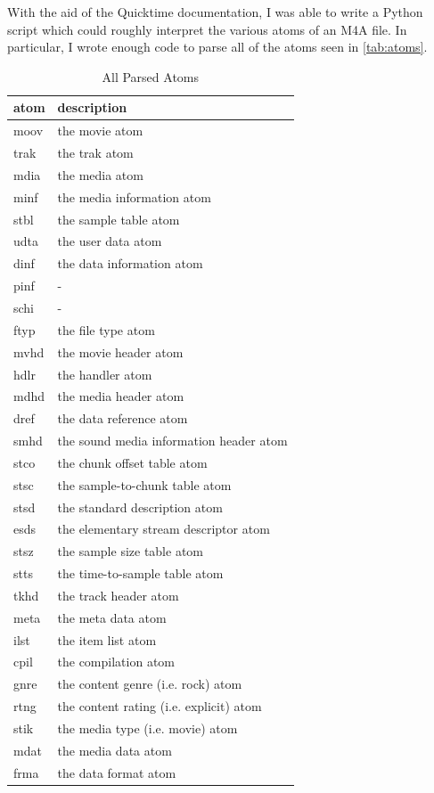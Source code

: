 \documentclass[journal]{vgtc}                %
\begin{document}
With the aid of the Quicktime documentation, I was able to write a Python script
which could roughly interpret the various atoms of an M4A file. In particular,
I wrote enough code to parse all of the atoms seen in \autoref{tab:atoms}.

\begin{table}[h]
  \caption{All Parsed Atoms}
  \label{tab:atoms}
  \scriptsize%
	\centering%
  \begin{tabu}{l l}
  \toprule
    atom & description \\
  \midrule
    moov & the movie atom \\
    trak & the trak atom \\
    mdia & the media atom \\
    minf & the media information atom \\
    stbl & the sample table atom \\
    udta & the user data atom \\
    dinf & the data information atom \\
    pinf & - \\
    schi & - \\
    ftyp & the file type atom \\
    mvhd & the movie header atom \\
    hdlr & the handler atom \\
    mdhd & the media header atom \\
    dref & the data reference atom \\
    smhd & the sound media information header atom \\
    stco & the chunk offset table atom \\
    stsc & the sample-to-chunk table atom \\
    stsd & the standard description atom \\
    esds & the elementary stream descriptor atom \\
    stsz & the sample size table atom \\
    stts & the time-to-sample table atom \\
    tkhd & the track header atom \\
    meta & the meta data atom \\
    ilst & the item list atom \\
    cpil & the compilation atom \\
    gnre & the content genre (i.e. rock) atom \\
    rtng & the content rating (i.e. explicit) atom \\
    stik & the media type (i.e. movie) atom \\
    mdat & the media data atom \\
    frma & the data format atom \\
  \midrule
  \end{tabu}%
\end{table}
\end{document}
